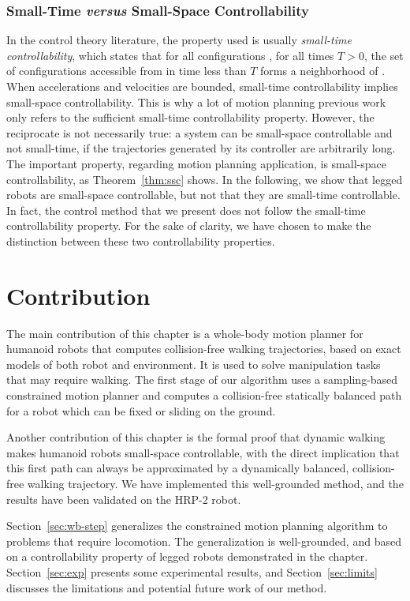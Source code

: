 \subsubsection{Small-Time \textit{versus} Small-Space Controllability}
In the control theory literature, the property used is usually
\textit{small-time controllability}, which states that for all
configurations \config{}, for all times $T>0$, the set of configurations
accessible from \config{} in time less than $T$ forms a neighborhood of
\config{}. When accelerations and velocities are bounded, small-time
controllability implies small-space controllability. This is why a lot
of motion planning previous work only refers to the sufficient
small-time controllability property. However, the reciprocate is not
necessarily true: a system can be small-space controllable and not
small-time, if the trajectories generated by its controller are
arbitrarily long.  The important property, regarding motion planning
application, is small-space controllability, as Theorem~\ref{thm:ssc}
shows. In the following, we show that legged robots are small-space
controllable, but not that they are small-time controllable.  In fact,
the control method that we present does not follow the small-time
controllability property. For the sake of clarity, we have chosen to
make the distinction between these two controllability properties.

\section{Contribution}
\label{chap2-contribution}

The main contribution of this chapter is a whole-body motion planner
for humanoid robots that computes collision-free walking trajectories,
based on exact models of both robot and environment. It is used to
solve manipulation tasks that may require walking. The first stage of
our algorithm uses a sampling-based constrained motion planner and
computes a collision-free statically balanced path for a robot which
can be fixed or sliding on the ground.

Another contribution of this chapter is the formal proof that dynamic
walking makes humanoid robots small-space controllable, with the
direct implication that this first path can always be approximated by
a dynamically balanced, collision-free walking trajectory. We have
implemented this well-grounded method, and the results have been
validated on the HRP-2 robot.

Section~\ref{sec:wb-step} generalizes the constrained motion planning
algorithm to problems that require locomotion. The generalization is
well-grounded, and based on a controllability property of legged
robots demonstrated in the chapter. Section~\ref{sec:exp} presents
some experimental results, and Section~\ref{sec:limits} discusses the
limitations and potential future work of our method.

